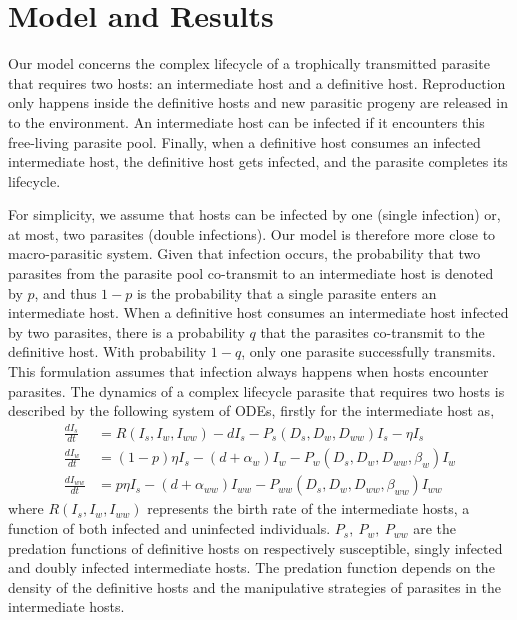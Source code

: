 \documentclass[11pt]{article}
\begin{document}
\section*{Model and Results}

Our model concerns the complex lifecycle of a trophically transmitted parasite that requires two hosts: an intermediate host and a definitive host. 
Reproduction only happens inside the definitive hosts and new parasitic progeny are released in to the environment. An intermediate host can be infected if it encounters this free-living parasite pool. 
Finally, when a definitive host consumes an infected intermediate host, the definitive host gets infected, and the parasite completes its lifecycle.


For simplicity, we assume that hosts can be infected by one (single infection) or, at most, two parasites (double infections). Our model is therefore more close to macro-parasitic system.
Given that infection occurs, the probability that two parasites from the parasite pool co-transmit to an intermediate host is denoted by  $p$, and thus $1-p$ is the probability that a single parasite enters an intermediate host. 
When a definitive host consumes an intermediate host infected by two parasites, there is a probability $q$ that the parasites co-transmit to the definitive host.
With probability $1-q$, only one parasite successfully transmits. 
This formulation assumes that infection always happens when hosts encounter parasites.
The dynamics of a complex lifecycle parasite that requires two hosts is described by the following system of ODEs, firstly for the intermediate host as,
%
\begin{align}
\frac{dI_s}{dt} &= R(I_s, I_w, I_{ww}) - d I_s - P_s(D_s, D_w, D_{ww}) I_s  - \eta  I_s \nonumber \\ 
\frac{dI_w}{dt} &=  (1 - p) \eta I_s  - (d + \alpha_w) I_w - P_w(D_s, D_w, D_{ww}, \beta_w) I_w \label{odes:ihosts} \\
\frac{dI_{ww}}{dt} &= p \eta I_s  - (d + \alpha_{ww}) I_{ww} - P_{ww}(D_s, D_w, D_{ww}, \beta_{ww}) I_{ww} \nonumber
\end{align}
%
where $R(I_s, I_w, I_{ww})$ represents the birth rate of the intermediate hosts, a function of both infected and uninfected individuals.
$P_s, \ P_w, \ P_{ww}$ are the predation functions of definitive hosts on  respectively susceptible, singly infected and doubly infected intermediate hosts. 
The predation function depends on the density of the definitive hosts and the manipulative strategies of parasites in the intermediate hosts. 
\end{document}
